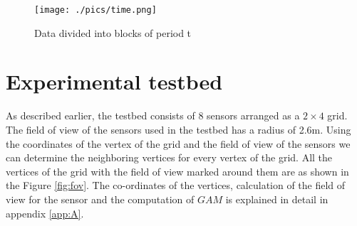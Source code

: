 \begin{figure}[!ht]
\texttt{[image: ./pics/time.png]}
\caption{Data divided into blocks of period t}
\label{fig:time}
\end{figure}

\section{Experimental testbed}
As described earlier, the testbed consists of 8 sensors arranged as a $2 \times 4$ grid.
The field of view of the sensors used in the testbed has a radius of 2.6m.
Using the coordinates of the vertex of the grid and the field of view of the sensors we can determine the neighboring vertices for every vertex of the grid.
All the vertices of the grid with the field of view marked around them are as shown in the Figure \ref{fig:fov}. 
The co-ordinates of the vertices, calculation of the field of view for the sensor and the computation of $GAM$ is explained in detail in appendix \ref{app:A}. 




